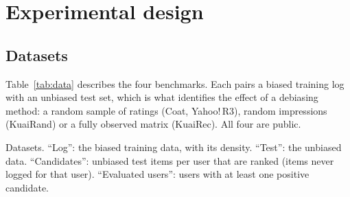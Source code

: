 \section{Experimental design}\label{sec:setup}

\subsection{Datasets}\label{sec:data}

Table~\ref{tab:data} describes the four benchmarks. Each pairs a biased
training log with an unbiased test set, which is what identifies the effect of a
debiasing method: a random sample of ratings (Coat, Yahoo!\,R3), random
impressions (KuaiRand) or a fully observed matrix (KuaiRec). All four are public.

\begin{table}[t]\centering\scriptsize
\caption{Datasets. ``Log'': the biased training data, with its density.
``Test'': the unbiased data. ``Candidates'': unbiased test items per user that are
ranked (items never logged for that user). ``Evaluated users'': users with at
least one positive candidate.}\label{tab:data}
\begin{adjustbox}{max width=\textwidth}

\end{adjustbox}
\end{table}

